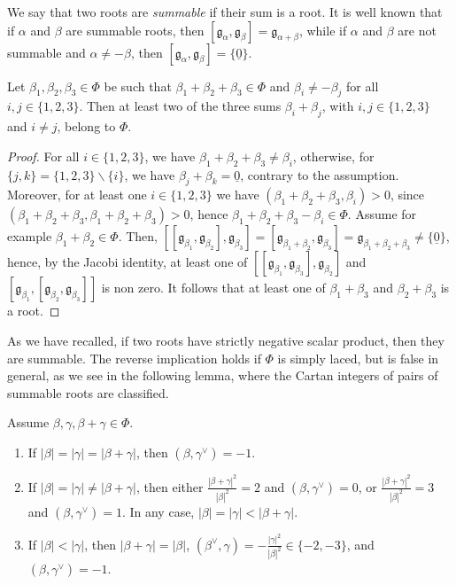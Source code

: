 \documentclass[ALCO,published]{cedram}
\theoremstyle{plain}
\newcommand\mf{\mathfrak}
\newcommand\smeno{\smallsetminus}
\newcommand\nullvec{\underline 0}
\newcommand\al{\alpha}
\newcommand\be{\beta}
\newcommand\ga{\gamma}
\begin{document}
\par
We say that two roots are {\it summable} if their sum is a root.
It is well known that if $\al$ and $\be$ are summable roots, then $[\mf g_\al,\mf g_\be]=\mf g_{\al+\be}$, while if  $\al$ and $\be$ are not summable and $\al\neq -\be$, then  $[\mf g_\al,\mf g_\be]=\{\nullvec\}$. 

\begin{pro}\label{pro:smart}
Let $\be_1, \be_2, \be_3\in  \Phi$ be such that $\be_1+\be_2+\be_3\in \Phi$  and $\be_i\neq -\be_j$ for all $i, j\in\{1, 2, 3\}$.
Then at least two of the three sums $\be_i+\be_j$, with $i, j\in\{1, 2, 3\}$ and $i\neq j$, belong to $\Phi$.
\end{pro}

\begin{proof}
For all $i\in \{1, 2, 3\}$, we have $\be_1+\be_2+\be_3\neq \be_i$, otherwise, for $\{j, k\}=\{1, 2, 3\}\smeno\{i\}$, we have $\be_j+\be_k=\nullvec$, contrary to the assumption.
Moreover, for at least one $i\in \{1, 2, 3\}$ we have $(\be_1+\be_2+\be_3, \be_i)>0$, since $(\be_1+\be_2+\be_3, \be_1+\be_2+\be_3)>0$,  hence  $\be_1+\be_2+\be_3- \be_i\in \Phi$. 
Assume for example $\be_1+\be_2\in \Phi$. 
Then, $[[\mf g_{\be_1}, \mf g_{\be_2}],\mf g_{\be_3}]=[\mf g_{\be_1+\be_2},\mf g_{\be_3}]=\mf g_{\be_1+\be_2+\be_3}\neq \{\nullvec\}$, hence, by the Jacobi identity, at least one of $[[\mf g_{\be_1}, \mf g_{\be_3}],\mf g_{\be_2}]$ 
and $[\mf g_{\be_1}, [\mf g_{\be_2},\mf g_{\be_3}]]$ is non zero. It follows that at least one of $\be_1+\be_3$ and $\be_2+\be_3$ is a root.
\end{proof}

\par
As we have recalled, if two roots have strictly negative scalar product, then they are summable. 
The reverse implication holds if $\Phi$ is simply laced, but is false in general, as we see in the following lemma, where the Cartan integers of pairs of summable roots are classified. 

\pagebreak

\begin{lem}\label{lem:esercizio}
Assume $\be, \ga, \be+\ga\in \Phi$. 
\begin{enumerate}
\item
If $|\be|=|\ga|=|\be+\ga|$, then $(\be, \ga^\vee)=-1$.
\label{itm:all-equal-lengths}
\item
If $|\be|=|\ga|\neq |\be+\ga|$, then either 
$\frac{|\be+\ga|^2}{ |\be|^2}= 2$ and  $(\be, \ga^\vee)=0$, or $\frac{|\be+\ga|^2}{ |\be|^2}=3$ and  $(\be, \ga^\vee)=1$. 
In any case, $|\be|=| \ga|< |\be+\ga|$.
\label{itm:equal-lengths-summands}
\item
If $|\be|<|\ga|$, then $|\be+\ga|=|\be|$, $(\be^\vee,\ga)=-\frac{|\ga|^2}{ |\be|^2}\in \{-2, -3\}$, and  $(\be, \ga^\vee)=-1$.  
\label{itm:two-lengths-summands}
\end{enumerate}
\end{lem}
\end{document}
